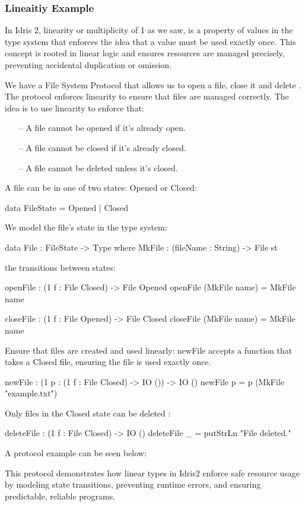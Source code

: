 \documentclass[]{rptuseminar}
\begin{document}
\subsubsection{Lineaitiy Example} 
In Idris 2, linearity or multiplicity of 1 as we saw, is a property of values in the type system that enforces the idea that a value must be used exactly once. This concept is rooted in linear logic and ensures resources are managed precisely, preventing accidental duplication or omission. 

\vspace{1em}  %
We have a File System Protocol that allows us to open a file, close it and delete . The protocol enforces linearity to ensure that files are managed correctly.
The idea is to use linearity to enforce that:
\begin{itemize}
  \item[--] A file cannot be opened if it's already open.
  \item[--] A file cannot be closed if it's already closed.
  \item[--] A file cannot be deleted unless it's closed.
\end{itemize}

A file can be in one of two states: Opened or Closed:
\begin{idris} 
  
  data FileState = Opened | Closed

\end{idris}
We model the file's state in the type system:
\begin{idris}
  data File : FileState -> Type where
    MkFile : (fileName : String) -> File st

\end{idris}
the transitions between states:
\begin{idris}
  openFile : (1 f : File Closed) -> File Opened
  openFile (MkFile name) = MkFile name
  
  closeFile : (1 f : File Opened) -> File Closed
  closeFile (MkFile name) = MkFile name
  
\end{idris}
Ensure that files are created and used linearly:
newFile accepts a function that takes a Closed file, ensuring the file is used exactly once.
\begin{idris}
  newFile : (1 p : (1 f : File Closed) -> IO ()) -> IO ()
  newFile p = p (MkFile "example.txt")
    
\end{idris}
Only files in the Closed state can be deleted :
\begin{idris}
  deleteFile : (1 f : File Closed) -> IO ()
  deleteFile _ = putStrLn "File deleted."
\end{idris}
A protocol example can be seen below:
This protocol demonstrates how linear types in Idris2 enforce safe resource usage by modeling state transitions, preventing runtime errors, and ensuring predictable, reliable programs.
\end{document}
